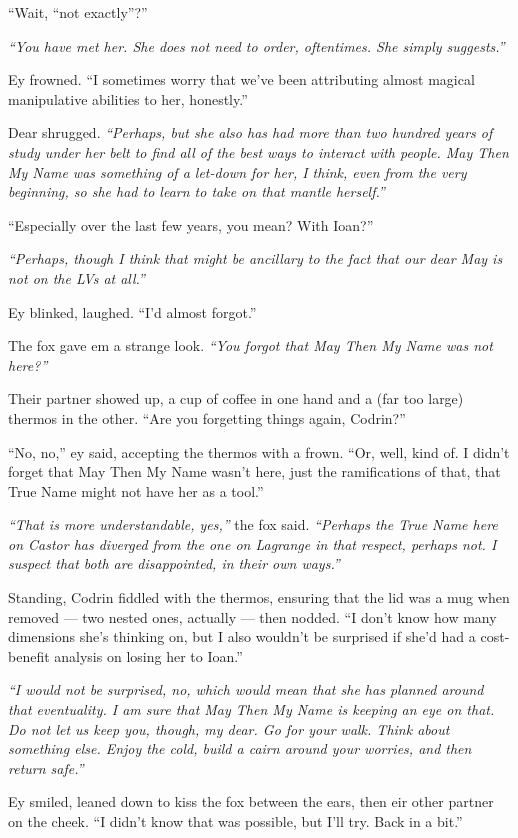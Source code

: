 ``Wait, ``not exactly''?''

\emph{``You have met her. She does not need to order, oftentimes. She simply suggests.''}

Ey frowned. ``I sometimes worry that we've been attributing almost magical manipulative abilities to her, honestly.''

Dear shrugged. \emph{``Perhaps, but she also has had more than two hundred years of study under her belt to find all of the best ways to interact with people. May Then My Name was something of a let-down for her, I think, even from the very beginning, so she had to learn to take on that mantle herself.''}

``Especially over the last few years, you mean? With Ioan?''

\emph{``Perhaps, though I think that might be ancillary to the fact that our dear May is not on the LVs at all.''}

Ey blinked, laughed. ``I'd almost forgot.''

The fox gave em a strange look. \emph{``You forgot that May Then My Name was not here?''}

Their partner showed up, a cup of coffee in one hand and a (far too large) thermos in the other. ``Are you forgetting things again, Codrin?''

``No, no,'' ey said, accepting the thermos with a frown. ``Or, well, kind of. I didn't forget that May Then My Name wasn't here, just the ramifications of that, that True Name might not have her as a tool.''

\emph{``That is more understandable, yes,''} the fox said. \emph{``Perhaps the True Name here on Castor has diverged from the one on Lagrange in that respect, perhaps not. I suspect that both are disappointed, in their own ways.''}

Standing, Codrin fiddled with the thermos, ensuring that the lid was a mug when removed — two nested ones, actually — then nodded. ``I don't know how many dimensions she's thinking on, but I also wouldn't be surprised if she'd had a cost-benefit analysis on losing her to Ioan.''

\emph{``I would not be surprised, no, which would mean that she has planned around that eventuality. I am sure that May Then My Name is keeping an eye on that. Do not let us keep you, though, my dear. Go for your walk. Think about something else. Enjoy the cold, build a cairn around your worries, and then return safe.''}

Ey smiled, leaned down to kiss the fox between the ears, then eir other partner on the cheek. ``I didn't know that was possible, but I'll try. Back in a bit.''

